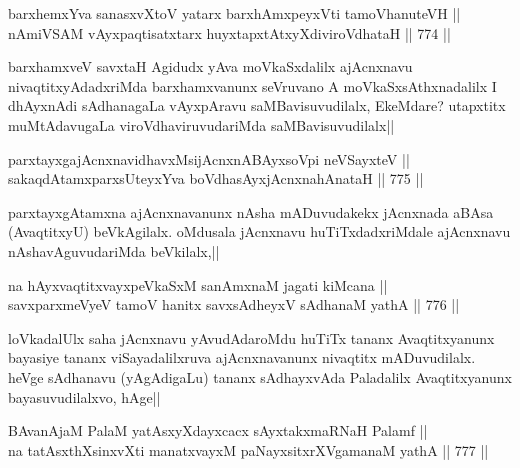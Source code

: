 \begin{shl}
barxhemxYva sanasxvXtoV yatarx barxhAmxpeyxVti tamoVhanuteVH || \\
nAmiVSAM vAyxpaqtisatxtarx huyxtapxtAtxyXdiviroVdhataH ||  774 ||  
\end{shl}

\begin{artha} 
barxhamxveV savxtaH Agidudx yAva moVkaSxdalilx ajAcnxnavu 
nivaqtitxyAdadxriMda barxhamxvanunx seVruvano A moVkaSxsAthxnadalilx I 
dhAyxnAdi sAdhanagaLa vAyxpAravu saMBavisuvudilalx, EkeMdare? 
utapxtitx muMtAdavugaLa viroVdhaviruvudariMda saMBavisuvudilalx||
\end{artha}


\begin{shl}
parxtayxgajAcnxnavidhavxMsijAcnxnABAyxsoV\s pi neVSayxteV || \\
sakaqdAtamxparxsUteyxYva boVdhasAyxjAcnxnahAnataH ||  775 ||  
\end{shl}

\begin{artha} 
parxtayxgAtamxna ajAcnxnavanunx nAsha mADuvudakekx jAcnxnada aBAsa 
(AvaqtitxyU) beVkAgilalx. oMdusala jAcnxnavu huTiTxdadxriMdale 
ajAcnxnavu nAshavAguvudariMda beVkilalx,||
\end{artha}

\begin{shl}
na hAyxvaqtitxvayxpeVkaSxM sanAmxnaM jagati kiMcana || \\
savxparxmeVyeV tamoV hanitx savxsAdheyxV sAdhanaM yathA ||  776 ||  
\end{shl}

\begin{artha} 
loVkadalUlx saha jAcnxnavu yAvudAdaroMdu huTiTx tananx Avaqtitxyanunx 
bayasiye tananx viSayadalilxruva ajAcnxnavanunx nivaqtitx 
mADuvudilalx. heVge sAdhanavu (yAgAdigaLu) tananx sAdhayxvAda 
Paladalilx Avaqtitxyanunx bayasuvudilalxvo, hAge||
\end{artha}


\begin{shl}
BAvanAjaM PalaM yatAsxyXdayxcacx sAyxtakxmaRNaH Palamf || \\
na tatAsxthXsinxvXti manatxvayxM paNayxsitxrXVgamanaM yathA ||  777 ||  
\end{shl}

